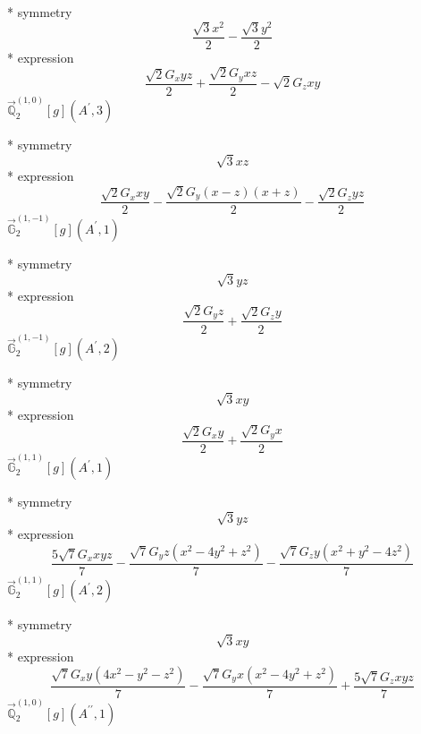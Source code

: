 \documentclass[fleqn,8pt]{jsarticle}
\begin{document}
\noindent\quad ** symmetry
\begin{dmath*}
\frac{\sqrt{3} x^{2}}{2} - \frac{\sqrt{3} y^{2}}{2}
\end{dmath*}
\noindent\quad ** expression
\begin{dmath*}
\frac{\sqrt{2} G_{x} y z}{2} + \frac{\sqrt{2} G_{y} x z}{2} - \sqrt{2} G_{z} x y
\end{dmath*}
\noindent\quad $\vec{\mathbb{Q}}_{2}^{(1,0)}[g](A^{\prime},3)$

\noindent\quad ** symmetry
\begin{dmath*}
\sqrt{3} x z
\end{dmath*}
\noindent\quad ** expression
\begin{dmath*}
\frac{\sqrt{2} G_{x} x y}{2} - \frac{\sqrt{2} G_{y} \left(x - z\right) \left(x + z\right)}{2} - \frac{\sqrt{2} G_{z} y z}{2}
\end{dmath*}
\noindent\quad $\vec{\mathbb{G}}_{2}^{(1,-1)}[g](A^{\prime},1)$

\noindent\quad ** symmetry
\begin{dmath*}
\sqrt{3} y z
\end{dmath*}
\noindent\quad ** expression
\begin{dmath*}
\frac{\sqrt{2} G_{y} z}{2} + \frac{\sqrt{2} G_{z} y}{2}
\end{dmath*}
\noindent\quad $\vec{\mathbb{G}}_{2}^{(1,-1)}[g](A^{\prime},2)$

\noindent\quad ** symmetry
\begin{dmath*}
\sqrt{3} x y
\end{dmath*}
\noindent\quad ** expression
\begin{dmath*}
\frac{\sqrt{2} G_{x} y}{2} + \frac{\sqrt{2} G_{y} x}{2}
\end{dmath*}
\noindent\quad $\vec{\mathbb{G}}_{2}^{(1,1)}[g](A^{\prime},1)$

\noindent\quad ** symmetry
\begin{dmath*}
\sqrt{3} y z
\end{dmath*}
\noindent\quad ** expression
\begin{dmath*}
\frac{5 \sqrt{7} G_{x} x y z}{7} - \frac{\sqrt{7} G_{y} z \left(x^{2} - 4 y^{2} + z^{2}\right)}{7} - \frac{\sqrt{7} G_{z} y \left(x^{2} + y^{2} - 4 z^{2}\right)}{7}
\end{dmath*}
\noindent\quad $\vec{\mathbb{G}}_{2}^{(1,1)}[g](A^{\prime},2)$

\noindent\quad ** symmetry
\begin{dmath*}
\sqrt{3} x y
\end{dmath*}
\noindent\quad ** expression
\begin{dmath*}
\frac{\sqrt{7} G_{x} y \left(4 x^{2} - y^{2} - z^{2}\right)}{7} - \frac{\sqrt{7} G_{y} x \left(x^{2} - 4 y^{2} + z^{2}\right)}{7} + \frac{5 \sqrt{7} G_{z} x y z}{7}
\end{dmath*}
\noindent\quad $\vec{\mathbb{Q}}_{2}^{(1,0)}[g](A^{\prime\prime},1)$
\end{document}
